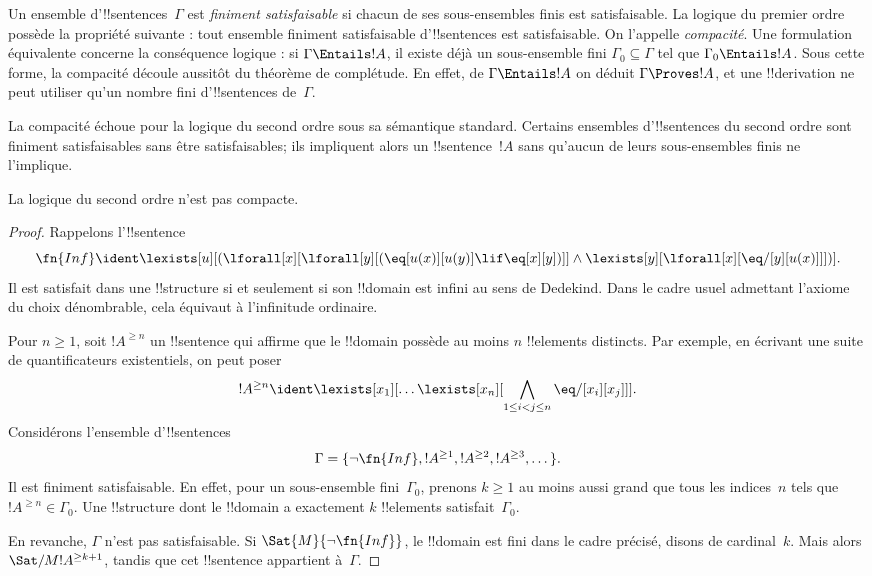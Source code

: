 \documentclass[../../../include/open-logic-section]{subfiles}
\begin{document}


\begin{explain}
Un ensemble d'!!{sentence}s~$\Gamma$ est
\emph{finiment satisfaisable} si chacun de ses
sous-ensembles finis est satisfaisable.
La logique du premier ordre possède la propriété
suivante : tout ensemble finiment satisfaisable
d'!!{sentence}s est satisfaisable. On l'appelle
\emph{compacité}. Une formulation équivalente
concerne la conséquence logique : si
$\Gamma\Entails !A$, il existe déjà un
sous-ensemble fini $\Gamma_0\subseteq\Gamma$
tel que $\Gamma_0\Entails !A$.
Sous cette forme, la compacité découle aussitôt
du théorème de complétude. En effet, de
$\Gamma\Entails !A$ on déduit
$\Gamma\Proves !A$, et une !!{derivation}
ne peut utiliser qu'un nombre fini
d'!!{sentence}s de~$\Gamma$.

La compacité échoue pour la logique du second
ordre sous sa sémantique standard. Certains
ensembles d'!!{sentence}s du second ordre
sont finiment satisfaisables sans être
satisfaisables; ils impliquent alors un
!!{sentence}~$!A$ sans qu'aucun de leurs
sous-ensembles finis ne l'implique.
\end{explain}

\begin{thm}
La logique du second ordre n'est pas compacte.
\end{thm}

\begin{proof}
Rappelons l'!!{sentence}
\[
\fn{Inf} \ident \lexists[u][(\lforall[x][\lforall[y][(\eq[u(x)][u(y)]
      \lif \eq[x][y])]] \land \lexists[y][\lforall[x][\eq/[y][u(x)]]])].
\]
Il est satisfait dans une !!{structure} si et
seulement si son !!{domain} est infini au sens
de Dedekind. Dans le cadre usuel admettant
l'axiome du choix dénombrable, cela équivaut
à l'infinitude ordinaire.

Pour $n\ge 1$, soit $!A^{\ge n}$ un
!!{sentence} qui affirme que le !!{domain}
possède au moins $n$ !!{element}s distincts.
Par exemple, en écrivant une suite de
quantificateurs existentiels, on peut poser
\[
!A^{\ge n}\ident
\lexists[x_1][\dots\lexists[x_n][
\bigwedge_{1\le i<j\le n}\eq/[x_i][x_j]]].
\]
Considérons l'ensemble d'!!{sentence}s
\[
\Gamma=\{\lnot\fn{Inf},
!A^{\ge1},!A^{\ge2},!A^{\ge3},\dots\}.
\]
Il est finiment satisfaisable. En effet, pour
un sous-ensemble fini~$\Gamma_0$, prenons
$k\ge1$ au moins aussi grand que tous les
indices~$n$ tels que $!A^{\ge n}\in\Gamma_0$.
Une !!{structure} dont le !!{domain} a exactement
$k$ !!{element}s satisfait~$\Gamma_0$.

En revanche, $\Gamma$ n'est pas satisfaisable.
Si $\Sat{M}{\lnot\fn{Inf}}$, le !!{domain}
est fini dans le cadre précisé, disons de
cardinal~$k$. Mais alors
$\Sat/{M}{!A^{\ge k+1}}$, tandis que cet
!!{sentence} appartient à~$\Gamma$.
\end{proof}
\end{document}
